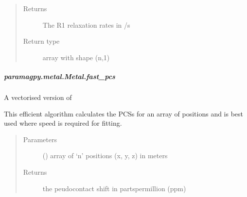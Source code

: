 \documentclass[a4paper,10pt,english,openany,oneside]{sphinxmanual}
\begin{document}
\begin{fulllineitems}
\begin{fulllineitems}
\begin{fulllineitems}
\begin{quote}
\begin{description}
\item[{Returns}] \leavevmode
\sphinxAtStartPar
{} \textendash{} The R1 relaxation rates in /s

\item[{Return type}] \leavevmode
\sphinxAtStartPar
array with shape (n,1)

\end{description}\end{quote}

\end{fulllineitems}



\subparagraph{paramagpy.metal.Metal.fast\_pcs}
\label{\detokenize{reference/generated/paramagpy.metal.Metal.fast_pcs:paramagpy-metal-metal-fast-pcs}}\label{\detokenize{reference/generated/paramagpy.metal.Metal.fast_pcs::doc}}

\begin{fulllineitems}
\label{\detokenize{reference/generated/paramagpy.metal.Metal.fast_pcs:paramagpy.metal.Metal.fast_pcs}}
\sphinxAtStartPar
A vectorised version of {\hyperref[\detokenize{reference/generated/paramagpy.metal.Metal.pcs:paramagpy.metal.Metal.pcs}]{}}

\sphinxAtStartPar
This efficient algorithm calculates the PCSs for an array of
positions and is best used where speed is required for fitting.
\begin{quote}\begin{description}
\item[{Parameters}] \leavevmode
\sphinxAtStartPar
{} (\sphinxstyleliteralemphasis{\sphinxupquote{ (}}\sphinxstyleliteralemphasis{\sphinxupquote{,}}\sphinxstyleliteralemphasis{\sphinxupquote{)}}) \textendash{} array of ‘n’ positions (x, y, z) in meters

\item[{Returns}] \leavevmode
\sphinxAtStartPar
{} \textendash{} the peudo\sphinxhyphen{}contact shift in parts\sphinxhyphen{}per\sphinxhyphen{}million (ppm)


\end{description}
\end{quote}
\end{fulllineitems}
\end{fulllineitems}
\end{fulllineitems}
\end{document}
